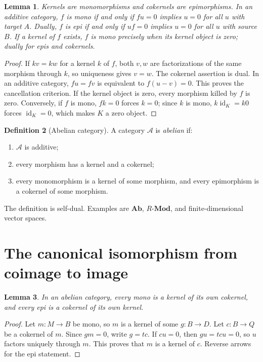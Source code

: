 \documentclass[11pt]{article}
\theoremstyle{definition}
\newtheorem{definition}{Definition}[section]
\theoremstyle{plain}
\newtheorem{lemma}[definition]{Lemma}
\newcommand{\A}{\mathcal A}
\newcommand{\id}{\operatorname{id}}
\newcommand{\Ab}{\mathbf{Ab}}
\newcommand{\Mod}{\mathbf{Mod}}
\begin{document}
\begin{lemma}\label{lem:cancel}
Kernels are monomorphisms and cokernels are epimorphisms. In an additive category, $f$ is mono if and only if $fu=0$ implies $u=0$ for all $u$ with target $A$. Dually, $f$ is epi if and only if $uf=0$ implies $u=0$ for all $u$ with source $B$. If a kernel of $f$ exists, $f$ is mono precisely when its kernel object is zero; dually for epis and cokernels.
\end{lemma}
\begin{proof}
If $kv=kw$ for a kernel $k$ of $f$, both $v,w$ are factorizations of the same morphism through $k$, so uniqueness gives $v=w$. The cokernel assertion is dual. In an additive category, $fu=fv$ is equivalent to $f(u-v)=0$. This proves the cancellation criterion. If the kernel object is zero, every morphism killed by $f$ is zero. Conversely, if $f$ is mono, $fk=0$ forces $k=0$; since $k$ is mono, $k\id_K=k0$ forces $\id_K=0$, which makes $K$ a zero object.
\end{proof}

\begin{definition}[Abelian category]
A category $\A$ is \emph{abelian} if:
\begin{enumerate}
\item $\A$ is additive;
\item every morphism has a kernel and a cokernel;
\item every monomorphism is a kernel of some morphism, and every epimorphism is a cokernel of some morphism.
\end{enumerate}
The definition is self-dual. Examples are $\Ab$, $R\text{-}\Mod$, and finite-dimensional vector spaces.
\end{definition}

\section{The canonical isomorphism from coimage to image}

\begin{lemma}\label{lem:normal}
In an abelian category, every mono is a kernel of its own cokernel, and every epi is a cokernel of its own kernel.
\end{lemma}
\begin{proof}
Let $m\colon M\to B$ be mono, so $m$ is a kernel of some $g\colon B\to D$. Let $c\colon B\to Q$ be a cokernel of $m$. Since $gm=0$, write $g=tc$. If $cu=0$, then $gu=tcu=0$, so $u$ factors uniquely through $m$. This proves that $m$ is a kernel of $c$. Reverse arrows for the epi statement.
\end{proof}
\end{document}
